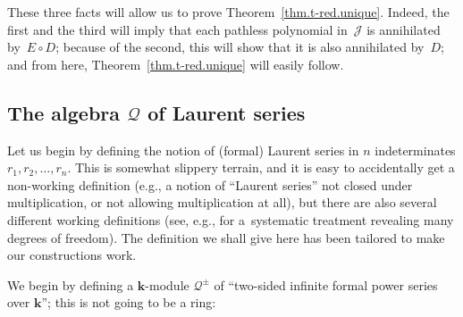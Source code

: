 \documentclass[11pt]{article}
\numberwithin{equation}{section}
\begin{document}
These three facts will allow us to prove Theorem~\ref{thm.t-red.unique}. Indeed, the first and the third will imply that each pathless polynomial in~$\mathcal{J}$ is annihilated by~$E\circ D$; because of the second, this will
show that it is also annihilated by~$D$; and from here, Theorem~\ref{thm.t-red.unique} will easily follow.

\subsection[The algebra $\mathcal{Q}$ of Laurent series]{The algebra $\boldsymbol{\mathcal{Q}}$ of Laurent series}

Let us begin by defining the notion of (formal) Laurent series in $n$ indeterminates $r_{1},r_{2},\ldots,r_{n}$. This is somewhat slippery terrain, and it is easy to accidentally get a non-working definition (e.g., a notion of ``Laurent series'' not closed under multiplication, or not allowing multiplication at all), but there are also several different working definitions (see, e.g., \cite{MonKau13} for a~systematic treatment revealing many degrees of freedom). The definition we shall give here has been tailored to make our constructions work.

We begin by defining a $\mathbf{k}$-module $\mathcal{Q}^{\pm}$ of ``two-sided infinite formal power series over $\mathbf{k}$''; this is not going to be a ring:
\end{document}
